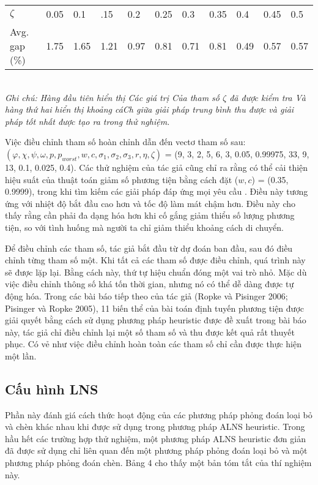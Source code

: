\begin{table}[caption={Parameter $\zeta$ vs. Solution Quality}, label=tab:2]
    \begin{tabular}{@{}lllllllllll@{}}
        \hline
        $\zeta$ & 0.05 & 0.1  & .15  & 0.2  & 0.25 & 0.3  & 0.35 & 0.4  & 0.45 & 0.5     \\
        Avg. gap (\%) & 1.75 & 1.65 & 1.21 & 0.97 & 0.81 & 0.71 & 0.81 & 0.49 & 0.57 & 0.57     \\ \bottomrule
        \end{tabular} \\
        \justify
        \textit{Ghi chú: Hàng đầu tiên hiển thị Các giá trị Của tham số $\zeta$ đã được kiểm tra Và hàng thứ hai hiển thị khoảng cáCh giữa giải pháp trung bình thu được và giải pháp tốt nhất được tạo ra trong thử nghiệm.}
\end{table}

Việc điều chỉnh tham số hoàn chỉnh dẫn đến vectơ tham số sau:
$(\varphi, \chi, \psi, \omega, p,  p_{worst}, w, c, \sigma_1, \sigma_2, \sigma_3, r, \eta, \zeta)$ = (9, 3, 2, 5, 6, 3, 0.05, 0.99975, 33, 9, 13, 0.1, 0.025, 0.4). Các thử nghiệm của tác giả cũng chỉ ra rằng có thể cải thiện hiệu suất của thuật toán giảm số phương tiện bằng cách đặt ($w,c$)  = (0.35, 0.9999), trong khi tìm kiếm các giải pháp đáp ứng mọi yêu cầu . Điều này tương ứng với nhiệt độ bắt đầu cao hơn và tốc độ làm mát chậm hơn. Điều này cho thấy rằng cần phải đa dạng hóa hơn khi cố gắng giảm thiểu số lượng phương tiện, so với tình huống mà người ta chỉ giảm thiểu khoảng cách di chuyển.

Để điều chỉnh các tham số, tác giả bắt đầu từ dự đoán ban đầu, sau đó điều chỉnh từng tham số một. Khi tất cả các tham số được điều chỉnh, quá trình này sẽ được lặp lại. Bằng cách này, thứ tự hiệu chuẩn đóng một vai trò nhỏ. Mặc dù việc điều chỉnh thông số khá tốn thời gian, nhưng nó có thể dễ dàng được tự động hóa. Trong các bài báo tiếp theo của tác giả (Ropke và Pisinger 2006; Pisinger và Ropke 2005), 11 biến thể của bài toán định tuyến phương tiện được giải quyết bằng cách sử dụng phương pháp heuristic được đề xuất trong bài báo này, tác giả chỉ điều chỉnh lại một số tham số và thu được kết quả rất thuyết phục. Có vẻ như việc điều chỉnh hoàn toàn các tham số chỉ cần được thực hiện một lần.

\subsection{Cấu hình LNS}
Phần này đánh giá cách thức hoạt động của các phương pháp phỏng đoán loại bỏ và chèn khác nhau khi được sử dụng trong phương pháp ALNS heuristic. Trong hầu hết các trường hợp thử nghiệm, một phương pháp ALNS heuristic đơn giản đã được sử dụng chỉ liên quan đến một phương pháp phỏng đoán loại bỏ và một phương pháp phỏng đoán chèn. Bảng 4 cho thấy một bản tóm tắt của thí nghiệm này.


